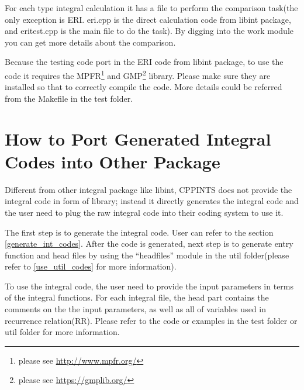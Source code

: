 For each type integral calculation it has a file to perform the comparison
task(the only exception is ERI. eri.cpp is the direct calculation code from
libint package, and eritest.cpp is the main file to do the task). By digging into
the work module you can get more details about the comparison.

Because the testing code port in the ERI code from libint package, to use the 
code it requires the MPFR\footnote{please see \url{http://www.mpfr.org/}} and 
GMP\footnote{please see \url{https://gmplib.org/}} library. Please make sure
they are installed so that to correctly compile the code. More details could
be referred from the Makefile in the test folder.

\section{How to Port Generated Integral Codes into Other Package}
%
%
%
Different from other integral package like libint, CPPINTS does not provide
the integral code in form of library; instead it directly generates the 
integral code and the user need to plug the raw integral code into their
coding system to use it.

The first step is to generate the integral code. User can refer to the 
section \ref{generate_int_codes}. After the code is generated, next step
is to generate entry function and head files by using the ``headfiles''
module in the util folder(please refer to \ref{use_util_codes} for more
information).

To use the integral code, the user need to provide the input parameters
in terms of the integral functions. For each integral file, the head part
contains the comments on the the input parameters, as well as all of
variables used in recurrence relation(RR). Please refer to the code or 
examples in the test folder or util folder for more information.

